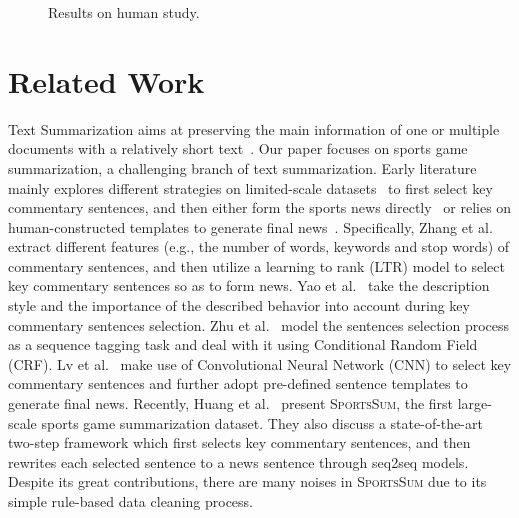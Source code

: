 \begin{figure}[t]
\centering
{}
\caption{Results on human study.}
\label{fig:huamn_evaluation}
\end{figure}

\section{Related Work}
Text Summarization aims at preserving the main information of one or multiple documents with a relatively short text~\cite{rush-etal-2015-neural,chopra-etal-2016-abstractive,Nallapati2016AbstractiveTS}.
Our paper focuses on sports game summarization, a challenging branch of text summarization.
Early literature mainly explores different strategies on limited-scale datasets~\cite{zhang-etal-2016-towards,Wan2016OverviewOT} to first select key commentary sentences, and then either form the sports news directly~\cite{zhang-etal-2016-towards,Zhu2016ResearchOS,Yao2017ContentSF} or relies on human-constructed templates to generate final news~\cite{Liu2016SportsNG,lv2020generate}.
Specifically, Zhang et al.~\cite{zhang-etal-2016-towards} extract different features (e.g., the number of words, keywords and stop words) of commentary sentences, and then utilize a learning to rank (LTR) model to select key commentary sentences so as to form news. Yao et al.~\cite{Yao2017ContentSF} take the description style and the importance of the described behavior into account during key commentary sentences selection. Zhu et al.~\cite{Zhu2016ResearchOS} model the sentences selection process as a sequence tagging task and deal with it using Conditional Random Field (CRF).
Lv et al.~\cite{lv2020generate} make use of Convolutional Neural Network (CNN) to select key commentary sentences and further adopt pre-defined sentence templates to generate final news.
Recently, Huang et al.~\cite{Huang2020GeneratingSN} present \textsc{SportsSum}, the first large-scale sports game summarization dataset. They also discuss a state-of-the-art two-step framework which first selects key commentary sentences, and then rewrites each selected sentence to a news sentence through seq2seq models.
Despite its great contributions, there are many noises in \textsc{SportsSum} due to its simple rule-based data cleaning process. %


